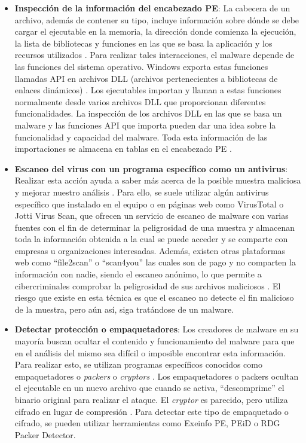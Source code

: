 \begin{itemize}
    \item \textbf{Inspección de la información del encabezado \gls{PE}}: La cabecera de un archivo, además de contener su tipo, incluye información sobre dónde se debe cargar el ejecutable en la memoria, la dirección donde comienza la ejecución, la lista de bibliotecas y funciones en las que se basa la aplicación y los recursos utilizados \cite{86}. Para realizar tales interacciones, el malware depende de las funciones del sistema operativo. Windows exporta estas funciones llamadas \gls{API} en archivos \gls{DLL} (archivos pertenecientes a bibliotecas de enlaces dinámicos) \cite{103}. Los ejecutables importan y llaman a estas funciones normalmente desde varios archivos \gls{DLL} que proporcionan diferentes funcionalidades. La inspección de los archivos \gls{DLL} en las que se basa un malware y las funciones \gls{API} que importa pueden dar una idea sobre la funcionalidad y capacidad del malware. Toda esta información de las importaciones se almacena en tablas en el encabezado \gls{PE} \cite{75}.

    \item \textbf{Escaneo del virus con un programa específico como un antivirus}: Realizar esta acción ayuda a saber más acerca de la posible muestra maliciosa y mejorar nuestro análisis \cite{LMA2018}. Para ello, se suele utilizar algún antivirus específico que instalado en el equipo o en páginas web como VirusTotal o Jotti Virus Scan, que ofrecen un servicio de escaneo de malware con varias fuentes con el fin de determinar la peligrosidad de una muestra y almacenan toda la información obtenida a la cual se puede acceder y se comparte con empresas u organizaciones interesadas. Además, existen otras plataformas web como “file2scan” o “scan4you” las cuales son de pago y no comparten la información con nadie, siendo el escaneo anónimo, lo que permite a cibercriminales comprobar la peligrosidad de sus archivos maliciosos \cite{EPN2014} \cite{LMA2018}. El riesgo que existe en esta técnica es que el escaneo no detecte el fin malicioso de la muestra, pero aún así, siga tratándose de un malware.
    
    \item \textbf{Detectar protección o empaquetadores}: Los creadores de malware en su mayoría buscan ocultar el contenido y funcionamiento del malware para que en el análisis del mismo sea difícil o imposible encontrar esta información. Para realizar esto, se utilizan programas específicos conocidos como empaquetadores o \textit{packers} o \textit{cryptors} \cite{EPN2014}. Los empaquetadores o packers ocultan el ejecutable en un nuevo archivo que cuando se activa, “descomprime” el binario original para realizar el ataque. El \textit{cryptor} es parecido, pero utiliza cifrado en lugar de compresión \cite{LMA2018}. Para detectar este tipo de empaquetado o cifrado, se pueden utilizar herramientas como Exeinfo PE,  PEiD o RDG Packer Detector.
    

\end{itemize}
